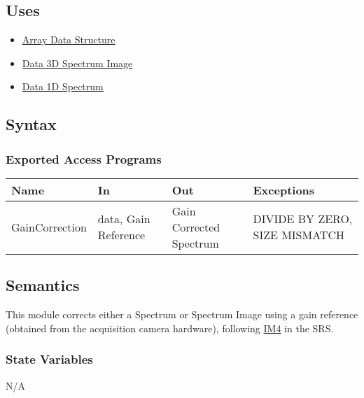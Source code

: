 \documentclass[12pt, titlepage]{article}
\begin{document}
\subsection{Uses}
\begin{itemize}
    \item \hyperref[Mod:Array]{Array Data Structure}
    \item \hyperref[Mod:SI]{Data 3D Spectrum Image}
    \item \hyperref[Mod:Spectrum]{Data 1D Spectrum}
\end{itemize}

\subsection{Syntax}

\subsubsection{Exported Access Programs}

\begin{center}
    \begin{tabular}{p{3cm} p{4cm} p{4cm} p{4cm}}
        \hline
        \textbf{Name} & \textbf{In} & \textbf{Out} & \textbf{Exceptions} \\
        \hline
        GainCorrection & data, Gain Reference & Gain Corrected Spectrum & DIVIDE BY
        ZERO, SIZE MISMATCH \\
        \hline
    \end{tabular}
\end{center}

\subsection{Semantics}
This module corrects either a Spectrum or Spectrum Image using a gain reference
(obtained from the acquisition camera hardware), following \hyperref[gain]{IM4}
in the SRS.

\subsubsection{State Variables}
N/A
\end{document}
